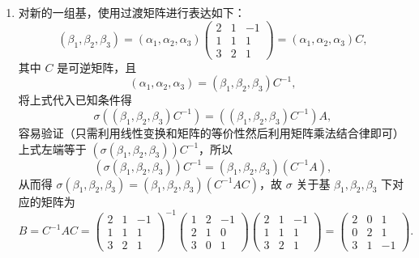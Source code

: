\begin{solution}
    \begin{enumerate}
        \item 对新的一组基，使用过渡矩阵进行表达如下：
              \[(\beta_{1}, \beta_{2}, \beta_{3})=(\alpha_{1}, \alpha_{2}, \alpha_{3})\begin{pmatrix}
                      2 & 1 & -1 \\
                      1 & 1 & 1  \\
                      3 & 2 & 1
                  \end{pmatrix}=(\alpha_{1}, \alpha_{2}, \alpha_{3}) C,\]
              其中 $C$ 是可逆矩阵，且
              \[(\alpha_{1},\alpha_{2},\alpha_{3})=(\beta_{1},\beta_{2},\beta_{3}) C^{-1},\]
              将上式代入已知条件得
              \[\sigma((\beta_{1}, \beta_{2}, \beta_{3}) C^{-1})=((\beta_{1}, \beta_{2}, \beta_{3}) C^{-1}) A,\]
              容易验证（只需利用线性变换和矩阵的等价性然后利用矩阵乘法结合律即可）上式左端等于 $(\sigma(\beta_{1}, \beta_{2}, \beta_{3})) C^{-1}$，所以
              \[(\sigma(\beta_{1}, \beta_{2}, \beta_{3})) C^{-1}=(\beta_{1}, \beta_{2}, \beta_{3})(C^{-1} A),\]
              从而得 $\sigma(\beta_{1}, \beta_{2}, \beta_{3})=(\beta_{1}, \beta_{2}, \beta_{3})(C^{-1} A C)$，故 $\sigma$ 关于基 $\beta_{1}, \beta_{2}, \beta_{3}$ 下对应的矩阵为
              \[B=C^{-1} A C = \begin{pmatrix}
                      2 & 1 & -1 \\
                      1 & 1 & 1  \\
                      3 & 2 & 1
                  \end{pmatrix}^{-1}\begin{pmatrix}
                      1 & 2 & -1 \\
                      2 & 1 & 0  \\
                      3 & 0 & 1
                  \end{pmatrix}\begin{pmatrix}
                      2 & 1 & -1 \\
                      1 & 1 & 1  \\
                      3 & 2 & 1
                  \end{pmatrix}=\begin{pmatrix}
                      2 & 0 & 1  \\
                      0 & 2 & 1  \\
                      3 & 1 & -1
                  \end{pmatrix}.\]


\end{enumerate}
\end{solution}

